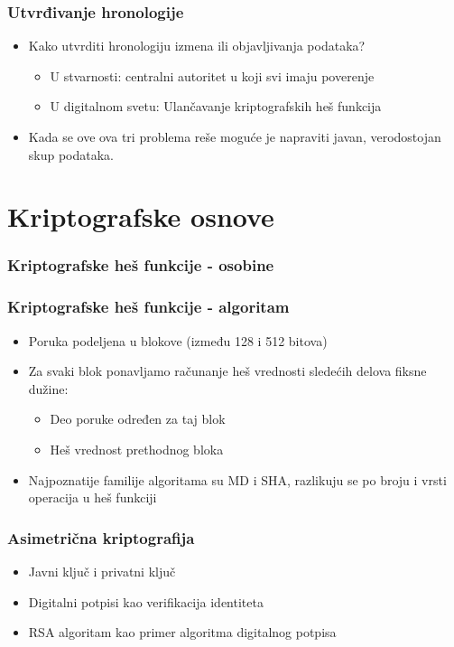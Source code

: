 \documentclass{beamer}
\begin{document}
\begin{frame}[fragile]\frametitle{Utvrđivanje hronologije}
	\begin{itemize}
		\item Kako utvrditi hronologiju izmena ili objavljivanja podataka?
		\begin{itemize}
			\item U stvarnosti: centralni autoritet u koji svi imaju poverenje
			\item U digitalnom svetu: Ulančavanje kriptografskih heš funkcija
		\end{itemize}
		\item Kada se ove ova tri problema reše moguće je napraviti javan, verodostojan skup podataka.
	\end{itemize}
\end{frame}


\section{Kriptografske osnove}

\begin{frame}[fragile]\frametitle{Kriptografske heš funkcije - osobine}
	
\end{frame}

\begin{frame}[fragile]\frametitle{Kriptografske heš funkcije - algoritam}
	 \begin{itemize}
            \item Poruka podeljena u blokove (između 128 i 512 bitova)
            \item Za svaki blok ponavljamo računanje heš vrednosti sledećih delova fiksne dužine:
            \begin{itemize}
                \item Deo poruke određen za taj blok
                \item Heš vrednost prethodnog bloka
            \end{itemize}
            \item Najpoznatije familije algoritama su MD i SHA, razlikuju se po broju i vrsti operacija u heš funkciji
        \end{itemize}
	
\end{frame}

\begin{frame}[fragile]\frametitle{Asimetrična kriptografija}
	\begin{itemize}
            \item Javni ključ i privatni ključ
            \item Digitalni potpisi kao verifikacija identiteta
            \item RSA algoritam kao primer algoritma digitalnog potpisa
        \end{itemize}
\end{frame}
\end{document}
